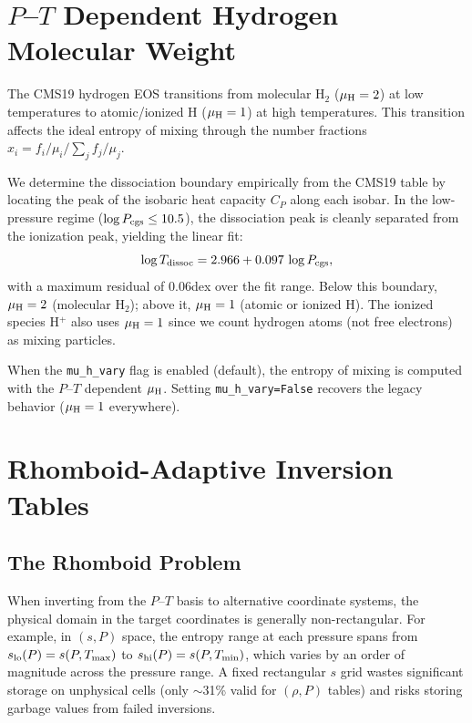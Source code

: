 \documentclass[twocolumn]{aastex701}
\begin{document}
\section{$P$--$T$ Dependent Hydrogen Molecular Weight}\label{sec:mu_h}

The CMS19 hydrogen EOS transitions from molecular H$_2$ ($\mu_{\rm H} = 2$) at low temperatures to atomic/ionized H ($\mu_{\rm H} = 1$) at high temperatures.
This transition affects the ideal entropy of mixing through the number fractions $x_i = f_i/\mu_i / \sum_j f_j/\mu_j$.

We determine the dissociation boundary empirically from the CMS19 table by locating the peak of the isobaric heat capacity $C_P$ along each isobar.
In the low-pressure regime ($\log P_{\rm cgs} \leq 10.5$), the dissociation peak is cleanly separated from the ionization peak, yielding the linear fit:
\begin{equation}\label{eq:dissoc}
    \log T_{\rm dissoc} = 2.966 + 0.097 \, \log P_{\rm cgs},
\end{equation}
with a maximum residual of 0.06\;dex over the fit range.
Below this boundary, $\mu_{\rm H} = 2$ (molecular H$_2$); above it, $\mu_{\rm H} = 1$ (atomic or ionized H).
The ionized species H$^+$ also uses $\mu_{\rm H} = 1$ since we count hydrogen atoms (not free electrons) as mixing particles.

When the \texttt{mu\_h\_vary} flag is enabled (default), the entropy of mixing is computed with the $P$--$T$ dependent $\mu_{\rm H}$.
Setting \texttt{mu\_h\_vary=False} recovers the legacy behavior ($\mu_{\rm H} = 1$ everywhere).

\section{Rhomboid-Adaptive Inversion Tables}\label{sec:rhomboid}

\subsection{The Rhomboid Problem}\label{sec:rhomboid_problem}

When inverting from the $P$--$T$ basis to alternative coordinate systems, the physical domain in the target coordinates is generally non-rectangular.
For example, in $(s, P)$ space, the entropy range at each pressure spans from $s_{\rm lo}(P) = s(P, T_{\rm max})$ to $s_{\rm hi}(P) = s(P, T_{\rm min})$, which varies by an order of magnitude across the pressure range.
A fixed rectangular $s$ grid wastes significant storage on unphysical cells (only $\sim$31\% valid for $(\rho, P)$ tables) and risks storing garbage values from failed inversions.
\end{document}
